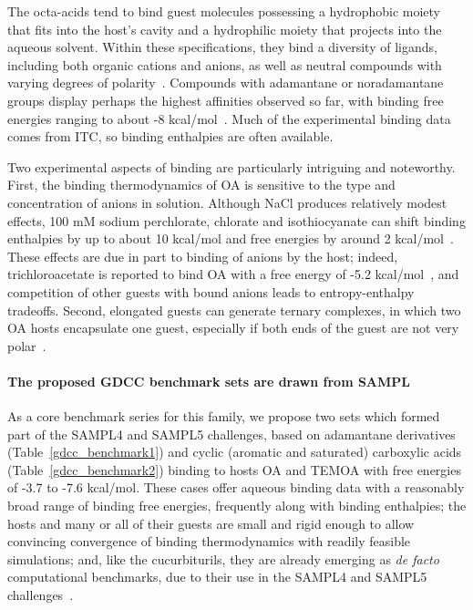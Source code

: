 \documentclass[aps,pre,twocolumn,nofootinbib,superscriptaddress,10pt, final,tightenlines]{revtex4-1}
\begin{document}
The octa-acids tend to bind guest molecules possessing a hydrophobic moiety that fits into the host's cavity and a hydrophilic moiety that projects into the aqueous solvent.  
Within these specifications, they bind a diversity of ligands, including both organic cations and anions, as well as neutral compounds with varying degrees of polarity~\cite{gibb_guests_2009, gibb_binding_2013}.  
Compounds with adamantane or noradamantane groups display perhaps the highest affinities observed so far, with binding free energies ranging to about -8 kcal/mol~\cite{sun_calorimetric_2008}.  
Much of the experimental binding data comes from ITC, so binding enthalpies are often available. 

Two experimental aspects of binding are particularly intriguing and noteworthy. 
First, the binding thermodynamics of OA is sensitive to the type and concentration of anions in solution. 
Although NaCl produces relatively modest effects, 100 mM sodium perchlorate, chlorate and isothiocyanate can shift binding enthalpies by up to about 10 kcal/mol and free energies by around 2 kcal/mol~\cite{gibb_anion_2011}. 
These effects are due in part to binding of anions by the host; indeed, trichloroacetate is reported to bind OA with a free energy of -5.2 kcal/mol~\cite{sokkalingam_binding_2016}, and competition of other guests with bound anions leads to entropy-enthalpy tradeoffs. 
Second, elongated guests can generate ternary complexes, in which two OA hosts encapsulate one guest, especially if both ends of the guest are not very polar~\cite{gibb_guests_2009}.  

\paragraph{The proposed GDCC benchmark sets are drawn from SAMPL}
As a core benchmark series for this family, we propose two sets which formed part of the SAMPL4 and SAMPL5 challenges, based on adamantane derivatives (Table~\ref{gdcc_benchmark1}) and cyclic (aromatic and saturated) carboxylic acids (Table~\ref{gdcc_benchmark2}) binding to hosts OA and TEMOA with free energies of -3.7 to -7.6 kcal/mol. These cases offer aqueous binding data with a reasonably broad range of binding free energies, frequently along with binding enthalpies; the hosts and many or all of their guests are small and rigid enough to allow convincing convergence of binding thermodynamics with readily feasible simulations; and, like the cucurbiturils, they are already emerging as \emph{de facto} computational benchmarks, due to their use in the SAMPL4 and SAMPL5 challenges~\cite{muddana_sampl4_2014, yin_sampl5_preprint}. 
\end{document}
